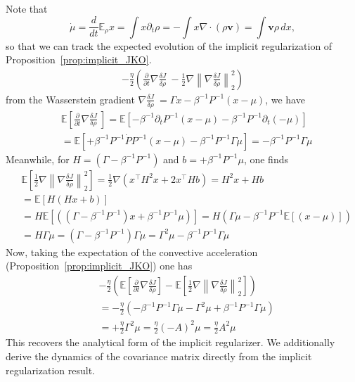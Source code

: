 \documentclass[reqno,11pt,letterpaper]{amsart}
\theoremstyle{plain}
\theoremstyle{definition}
\theoremstyle{remark}
\newcommand{\wagrad}{\nabla \frac{\delta J}{\delta \rho}}
\begin{document}
Note that 
\[
\dot{\mu}=\frac{d}{dt}\mathbb{E}_{\rho}x = \int x \partial_{t} \rho = -\int x \nabla \cdot (\rho \mathbf{v}) = \int \mathbf{v} \rho \, dx,\]
so that we can track the expected evolution of the implicit regularization of Proposition~\ref{prop:implicit_JKO}.
\begin{align*}
    -\frac{\eta}{2} \left( \frac{\partial}{\partial t} \wagrad\ - \frac{1}{2} \nabla \left\lVert \wagrad \right\rVert_{2}^{2} \right)
\end{align*}
from the Wasserstein gradient $\wagrad\ =\Gamma x - \beta^{-1} P^{-1} (x - \mu)$, we have
\begin{align*}
 &\mathbb{E}\left[\frac{\partial}{\partial t} \wagrad\ \right] = \mathbb{E}\left[- \beta^{-1} \partial_{t}P^{-1} (x - \mu) - \beta^{-1} P^{-1} \partial_{t} (-\mu) \right] \\
    &= \mathbb{E}\left[+ \beta^{-1} P^{-1} \dot{P} P^{-1} (x - \mu) - \beta^{-1} P^{-1} \Gamma \mu \right] = -\beta^{-1}P^{-1 }\Gamma\mu
\end{align*}
Meanwhile, for $H = (\Gamma - \beta^{-1}P^{-1})$ and $b=+\beta^{-1} P^{-1} \mu$, one finds
\begin{align*}
    &\mathbb{E} \left[\frac{1}{2}\nabla \left\lVert \wagrad \right\rVert_{2}^{2} \right] = \frac{1}{2} \nabla\left(
    x^{\top} H^{2} x + 2 x^{\top} H b
    \right) = H^{2}x + Hb \\
    &= \mathbb{E} \left[H(Hx + b) \right] \\
    &= H\mathbb{E} \left[((\Gamma - \beta^{-1}P^{-1})x + \beta^{-1} P^{-1} \mu) \right] = H \left( \Gamma \mu - \beta^{-1} P^{-1} \mathbb{E} \left[(x-\mu)\right]  \right) \\
    &= H \Gamma \mu = (\Gamma - \beta^{-1}P^{-1}) \Gamma \mu = \Gamma^{2}\mu - \beta^{-1} P^{-1} \Gamma \mu
\end{align*}
Now, taking the expectation of the convective acceleration (Proposition~\ref{prop:implicit_JKO}) one has
\begin{align*}
    &-\frac{\eta}{2} \left( \mathbb{E}\left[\frac{\partial}{\partial t} \wagrad \right] - \mathbb{E}\left[\frac{1}{2} \nabla \left\lVert \wagrad \right\rVert_{2}^{2} \right] \right) \\
    &= -\frac{\eta}{2} \left( 
    -\beta^{-1}P^{-1 }\Gamma\mu - \Gamma^{2}\mu + \beta^{-1} P^{-1} \Gamma \mu
    \right) \\
    &= + \frac{\eta}{2} \Gamma^{2} \mu = \frac{\eta}{2} (-A)^{2} \mu = \frac{\eta}{2} A^{2} \mu
\end{align*}
This recovers the analytical form of the implicit regularizer. We additionally derive the dynamics of the covariance matrix directly from the implicit regularization result.
\end{document}
